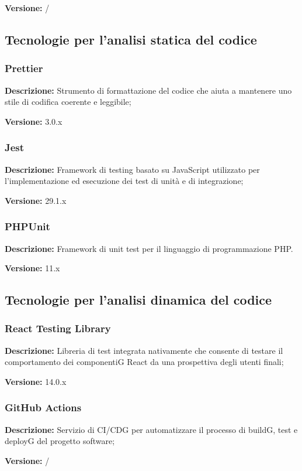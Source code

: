 \textbf{Versione:} /


\subsection{Tecnologie per l'analisi statica del codice}

\subsubsection{Prettier}

\textbf{Descrizione:} Strumento di formattazione del codice che aiuta a mantenere uno stile di codifica coerente e leggibile;

\textbf{Versione:} 3.0.x

\subsubsection{Jest}

\textbf{Descrizione:} Framework di testing basato su JavaScript utilizzato per l'implementazione ed esecuzione dei test di unità e di integrazione;

\textbf{Versione:} 29.1.x

\subsubsection{PHPUnit}

\textbf{Descrizione:} Framework di unit test per il linguaggio di programmazione PHP.

\textbf{Versione:} 11.x


\subsection{Tecnologie per l'analisi dinamica del codice}
\subsubsection{React Testing Library}

\textbf{Descrizione:} Libreria di test integrata nativamente che consente di testare il
comportamento dei componentiG React da una prospettiva degli utenti finali;

\textbf{Versione:} 14.0.x

\subsubsection{GitHub Actions}

\textbf{Descrizione:} Servizio di CI/CDG per automatizzare il processo di buildG, test e deployG del
progetto software;

\textbf{Versione:} /
